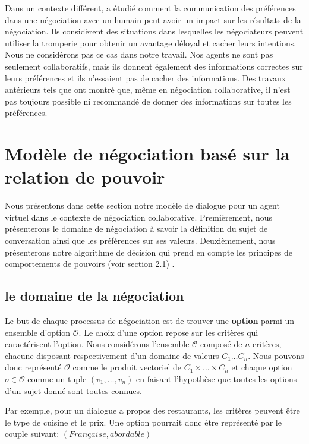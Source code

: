 \documentclass [french]{sig-alternate-05-2015}
\begin{document}
		Dans un contexte différent, \cite {nazari2015opponent} a étudié comment la communication des préférences dans une négociation avec un humain peut avoir un impact sur les résultats de la négociation. Ils considèrent des situations dans lesquelles les négociateurs peuvent utiliser la tromperie pour obtenir un avantage déloyal et cacher leurs intentions. Nous ne considérons pas ce cas dans notre travail. Nos agents ne sont pas seulement collaboratifs, mais ils donnent également des informations correctes sur leurs préférences et ils n'essaient pas de cacher des informations. Des travaux antérieurs tels que \cite {swartout2006toward} ont montré que, même en négociation collaborative, il n'est pas toujours possible ni recommandé de donner des informations sur toutes les préférences.



	\section{Modèle de négociation basé sur la relation de pouvoir}
		
		Nous présentons dans cette section notre modèle de dialogue pour un agent virtuel dans le contexte de négociation collaborative. 
		Premièrement, nous présenterons le domaine de négociation à savoir la définition du sujet de conversation ainsi que les préférences sur ses valeurs. 
		Deuxièmement, nous présenterons notre algorithme de décision qui prend en compte les principes de comportements de pouvoirs (voir section 2.1) .
		
		\subsection{le domaine de la négociation}
			Le but de chaque processus de négociation est de trouver une \textbf{option} parmi un ensemble d'option $\mathcal{O}$. Le choix d'une option repose sur les critères qui caractérisent l'option.  Nous considérons l'ensemble $\mathcal{C}$ composé de $n$ critères, chacune disposant respectivement d'un domaine de valeurs  $C_1 \ldots C_n$. Nous pouvons donc représenté $\mathcal{O}$ comme le produit vectoriel de  $C_1\times\ldots\times C_n$ et chaque option $o \in \mathcal{O}$ comme un tuple $(v_1,\ldots,v_n)$ en faisant l'hypothèse que toutes les options d'un sujet donné sont toutes connues.
	
		
		Par exemple, pour un dialogue a propos des restaurants, les critères peuvent être le type de cuisine et le prix. Une option pourrait donc être représenté par le couple suivant: $(Française, abordable)$
		
\end{document}
